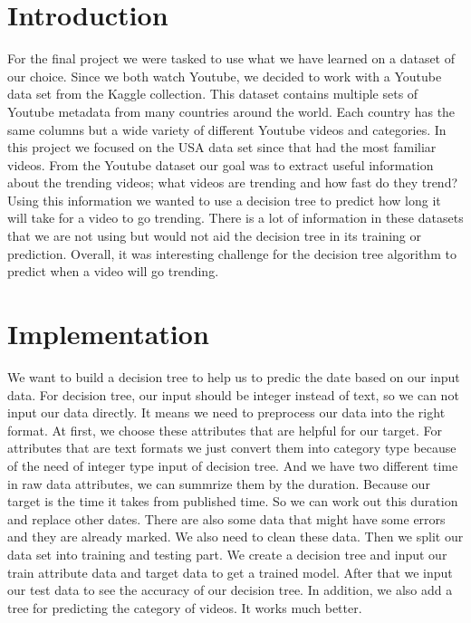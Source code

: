 \documentclass{article}
\begin{document}
\section*{Introduction}
For the final project we were tasked to use what we have learned on a dataset of our choice. 
Since we both watch Youtube, we decided to work with a Youtube data set from the Kaggle collection. 
This dataset contains multiple sets of Youtube metadata from many countries around the world. 
Each country has the same columns but a wide variety of different Youtube videos and categories. 
In this project we focused on the USA data set since that had the most familiar videos. 
From the Youtube dataset our goal was to extract useful information about the trending videos; what videos are trending and how fast do they trend?
Using this information we wanted to use a decision tree to predict how long it will take for a video to go trending. 
There is a lot of information in these datasets that we are not using but would not aid the decision tree in its training or prediction.
Overall, it was interesting challenge for the decision tree algorithm to predict when a video will go trending.
\section*{Implementation}

We want to build a decision tree to help us to predic the date based on our input data.
%
For decision tree, our input should be integer instead of text, so we can not input our data directly.
%
It means we need to preprocess our data into the right format.
%
At first, we choose these attributes that are helpful for our target. For attributes that are text formats we just convert them into category type because of the need of integer type input of decision tree.
%
And we have two different time in raw data attributes, we can summrize them by the duration.
%
Because our target is the time it takes from published time. So we can work out this duration and replace other dates.
%
There are also some data that might have some errors and they are already marked.
%
We also need to clean these data.
%
Then we split our data set into training and testing part.
%
We create a decision tree and input our train attribute data and target data to get a trained model.
%
After that we input our test data to see the accuracy of our decision tree.
%
In addition, we also add a tree for predicting the category of videos. It works much better.
\end{document}
